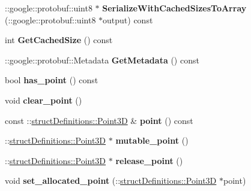 \begin{DoxyCompactItemize}
\item 
\hypertarget{classstruct_definitions_1_1_vertex_a195fbf6d22ca2c0baf3f4440975ebb5e}{}\label{classstruct_definitions_1_1_vertex_a195fbf6d22ca2c0baf3f4440975ebb5e} 
\+::google\+::protobuf\+::uint8 $\ast$ {\bfseries Serialize\+With\+Cached\+Sizes\+To\+Array} (\+::google\+::protobuf\+::uint8 $\ast$output) const
\item 
\hypertarget{classstruct_definitions_1_1_vertex_af8613f5f403d35aca2ed4f15e7d1fb4d}{}\label{classstruct_definitions_1_1_vertex_af8613f5f403d35aca2ed4f15e7d1fb4d} 
int {\bfseries Get\+Cached\+Size} () const
\item 
\hypertarget{classstruct_definitions_1_1_vertex_a3157665d620c217226f40b33c45cc4fc}{}\label{classstruct_definitions_1_1_vertex_a3157665d620c217226f40b33c45cc4fc} 
\+::google\+::protobuf\+::\+Metadata {\bfseries Get\+Metadata} () const
\item 
\hypertarget{classstruct_definitions_1_1_vertex_a140748aed2b608484fab0c8203bf3a72}{}\label{classstruct_definitions_1_1_vertex_a140748aed2b608484fab0c8203bf3a72} 
bool {\bfseries has\+\_\+point} () const
\item 
\hypertarget{classstruct_definitions_1_1_vertex_aa29b4846306be978c851bcb3f8e39d5e}{}\label{classstruct_definitions_1_1_vertex_aa29b4846306be978c851bcb3f8e39d5e} 
void {\bfseries clear\+\_\+point} ()
\item 
\hypertarget{classstruct_definitions_1_1_vertex_abf045490277126b92a92016be92c50be}{}\label{classstruct_definitions_1_1_vertex_abf045490277126b92a92016be92c50be} 
const \+::\hyperlink{classstruct_definitions_1_1_point3_d}{struct\+Definitions\+::\+Point3D} \& {\bfseries point} () const
\item 
\hypertarget{classstruct_definitions_1_1_vertex_a3536771591fadd32c48fd21b1a2b34a5}{}\label{classstruct_definitions_1_1_vertex_a3536771591fadd32c48fd21b1a2b34a5} 
\+::\hyperlink{classstruct_definitions_1_1_point3_d}{struct\+Definitions\+::\+Point3D} $\ast$ {\bfseries mutable\+\_\+point} ()
\item 
\hypertarget{classstruct_definitions_1_1_vertex_ac3a173a681d9bb36df2fe36d6510720b}{}\label{classstruct_definitions_1_1_vertex_ac3a173a681d9bb36df2fe36d6510720b} 
\+::\hyperlink{classstruct_definitions_1_1_point3_d}{struct\+Definitions\+::\+Point3D} $\ast$ {\bfseries release\+\_\+point} ()
\item 
\hypertarget{classstruct_definitions_1_1_vertex_aaf21e98ea9ffe316b5faad25d89cd8c8}{}\label{classstruct_definitions_1_1_vertex_aaf21e98ea9ffe316b5faad25d89cd8c8} 
void {\bfseries set\+\_\+allocated\+\_\+point} (\+::\hyperlink{classstruct_definitions_1_1_point3_d}{struct\+Definitions\+::\+Point3D} $\ast$point)

\end{DoxyCompactItemize}
